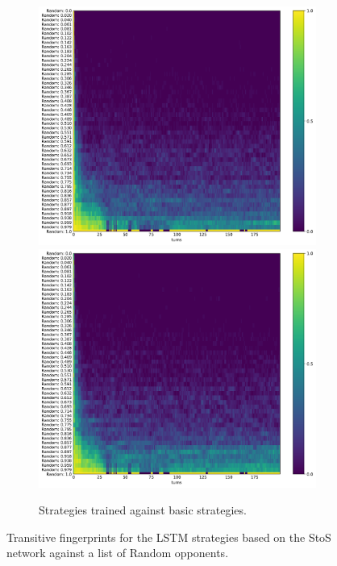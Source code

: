 \begin{figure}[!htbp]
\begin{subfigure}{\textwidth}
        \includegraphics[width=.3\textwidth]{src/chapters/07/img/default_basic_sequence_1.pdf}
        \includegraphics[width=.3\textwidth]{src/chapters/07/img/default_basic_sequence_0_78.pdf}
        \caption{Strategies trained against basic strategies.}
    \end{subfigure}
    \caption{Transitive fingerprints for the LSTM strategies based on the StoS
    network against a list of Random opponents.}\label{fig:transitive_fingerprints_default_s_to_s}
\end{figure}


